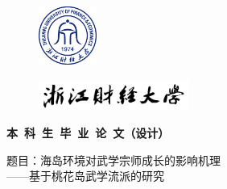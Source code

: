 \begin{titlepage}
\begin{figure}[htbp]
    \vspace{-1.3cm}
    \hspace{11.97cm}
	\includegraphics[width=1.9cm, height=1.91cm]{Img/a01_xh.png}
\end{figure}
\begin{figure}[htbp]
    \vspace{-0.9cm}
    \hspace{10.53cm}
    \includegraphics[height=1cm]{Img/zjcjdxxm.pdf}
\end{figure}

\begin{center}

\vspace{0.56cm}
\begin{center}
{\bf {\song{} \selectfont  本~科~生~毕~业~论~文（设计）}}
\end{center}

\vspace{3.3cm}

\begin{center}
{\heiti{} \selectfont 题目：海岛环境对武学宗师成长的影响机理 }\\
\vspace{1.4em}
{\kaishu{} \selectfont ——基于桃花岛武学流派的研究}
\end{center}


\end{center}
\end{titlepage}
